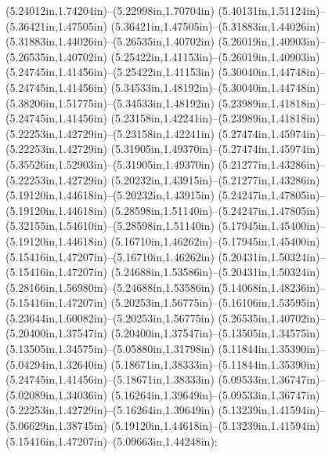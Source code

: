 (5.24012in,1.74204in)--(5.22998in,1.70704in) (5.40131in,1.51124in)--(5.36421in,1.47505in) (5.36421in,1.47505in)--(5.31883in,1.44026in) (5.31883in,1.44026in)--(5.26535in,1.40702in) (5.26019in,1.40903in)--(5.26535in,1.40702in) (5.25422in,1.41153in)--(5.26019in,1.40903in) (5.24745in,1.41456in)--(5.25422in,1.41153in) (5.30040in,1.44748in)--(5.24745in,1.41456in) (5.34533in,1.48192in)--(5.30040in,1.44748in) (5.38206in,1.51775in)--(5.34533in,1.48192in) (5.23989in,1.41818in)--(5.24745in,1.41456in) (5.23158in,1.42241in)--(5.23989in,1.41818in) (5.22253in,1.42729in)--(5.23158in,1.42241in) (5.27474in,1.45974in)--(5.22253in,1.42729in) (5.31905in,1.49370in)--(5.27474in,1.45974in) (5.35526in,1.52903in)--(5.31905in,1.49370in) (5.21277in,1.43286in)--(5.22253in,1.42729in) (5.20232in,1.43915in)--(5.21277in,1.43286in) (5.19120in,1.44618in)--(5.20232in,1.43915in) (5.24247in,1.47805in)--(5.19120in,1.44618in) (5.28598in,1.51140in)--(5.24247in,1.47805in) (5.32155in,1.54610in)--(5.28598in,1.51140in) (5.17945in,1.45400in)--(5.19120in,1.44618in) (5.16710in,1.46262in)--(5.17945in,1.45400in) (5.15416in,1.47207in)--(5.16710in,1.46262in) (5.20431in,1.50324in)--(5.15416in,1.47207in) (5.24688in,1.53586in)--(5.20431in,1.50324in) (5.28166in,1.56980in)--(5.24688in,1.53586in) (5.14068in,1.48236in)--(5.15416in,1.47207in) (5.20253in,1.56775in)--(5.16106in,1.53595in) (5.23644in,1.60082in)--(5.20253in,1.56775in) (5.26535in,1.40702in)--(5.20400in,1.37547in) (5.20400in,1.37547in)--(5.13505in,1.34575in) (5.13505in,1.34575in)--(5.05880in,1.31798in) (5.11844in,1.35390in)--(5.04294in,1.32640in) (5.18671in,1.38333in)--(5.11844in,1.35390in) (5.24745in,1.41456in)--(5.18671in,1.38333in) (5.09533in,1.36747in)--(5.02089in,1.34036in) (5.16264in,1.39649in)--(5.09533in,1.36747in) (5.22253in,1.42729in)--(5.16264in,1.39649in) (5.13239in,1.41594in)--(5.06629in,1.38745in) (5.19120in,1.44618in)--(5.13239in,1.41594in) (5.15416in,1.47207in)--(5.09663in,1.44248in);
